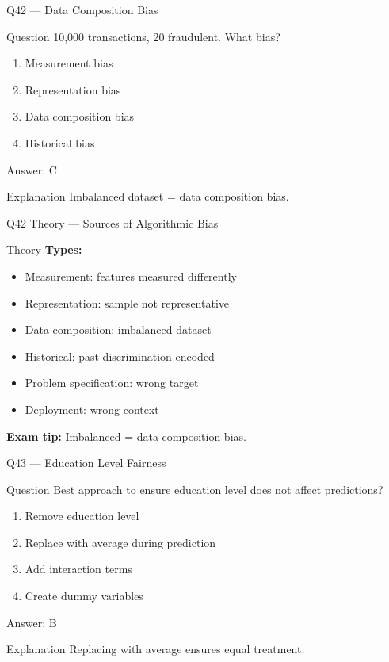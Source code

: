 \documentclass[aspectratio=169,8pt]{beamer}
\begin{document}
	\begin{frame}{Q42 --- Data Composition Bias}
		\begin{block}{Question}
			10,000 transactions, 20 fraudulent. What bias?
		\end{block}
		\begin{enumerate}[label=\Alph*.]
			\item Measurement bias
			\item Representation bias
			\item Data composition bias
			\item Historical bias
		\end{enumerate}
		\begin{exampleblock}{Answer: C}
		\end{exampleblock}
		\begin{block}{Explanation}
			Imbalanced dataset = data composition bias.
		\end{block}
	\end{frame}
	
	\begin{frame}{Q42 Theory --- Sources of Algorithmic Bias}
		\begin{block}{Theory}
			\textbf{Types:}
			\begin{itemize}
				\item Measurement: features measured differently
				\item Representation: sample not representative
				\item Data composition: imbalanced dataset
				\item Historical: past discrimination encoded
				\item Problem specification: wrong target
				\item Deployment: wrong context
			\end{itemize}
			\textbf{Exam tip:} Imbalanced = data composition bias.
		\end{block}
	\end{frame}
	
	\begin{frame}{Q43 --- Education Level Fairness}
		\begin{block}{Question}
			Best approach to ensure education level does not affect predictions?
		\end{block}
		\begin{enumerate}[label=\Alph*.]
			\item Remove education level
			\item Replace with average during prediction
			\item Add interaction terms
			\item Create dummy variables
		\end{enumerate}
		\begin{exampleblock}{Answer: B}
		\end{exampleblock}
		\begin{block}{Explanation}
			Replacing with average ensures equal treatment.
		\end{block}
	\end{frame}
	
\end{document}
